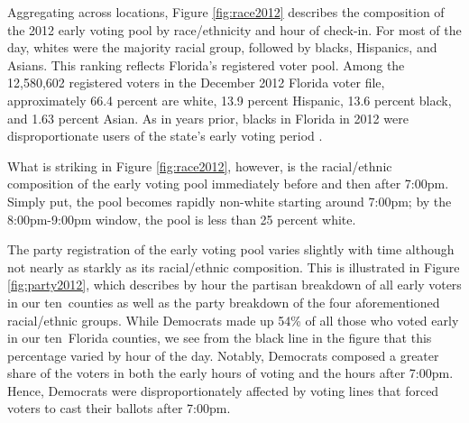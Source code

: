 \documentclass[12pt,titlepage]{article}
\newcommand{\numcounties}{ten}
\begin{document}
Aggregating across locations, Figure \ref{fig:race2012} describes the
composition of the 2012 early voting pool by race/ethnicity and hour
of check-in.  For most of the day, whites were the majority racial
group, followed by blacks, Hispanics, and Asians.  This ranking
reflects Florida's registered voter pool.  Among the 12,580,602
registered voters in the December 2012 Florida voter file,
approximately 66.4 percent are white, 13.9 percent Hispanic, 13.6
percent black, and 1.63 percent Asian.  As in years prior, blacks in
Florida in 2012 were disproportionate users of the state's early
voting period \citep{herronsmith:souls}.





What is striking in Figure \ref{fig:race2012}, however, is the
racial/ethnic composition of the early voting pool immediately before
and then after 7:00pm.  Simply put, the pool becomes rapidly non-white
starting around 7:00pm; by the 8:00pm-9:00pm window, the pool is less
than 25 percent white.

The party registration of the early voting pool varies slightly with
time although not nearly as starkly as its racial/ethnic composition.
This is illustrated in Figure \ref{fig:party2012}, which describes by
hour the partisan breakdown of all early voters in our \numcounties\
counties as well as the party breakdown of the four aforementioned
racial/ethnic groups.  While Democrats made up 54\% of all those who
voted early in our \numcounties\ Florida counties, we see from the
black line in the figure that this percentage varied by hour of the
day.  Notably, Democrats composed a greater share of the voters in
both the early hours of voting and the hours after 7:00pm.  Hence,
Democrats were disproportionately affected by voting lines that forced
voters to cast their ballots after 7:00pm.
\end{document}
